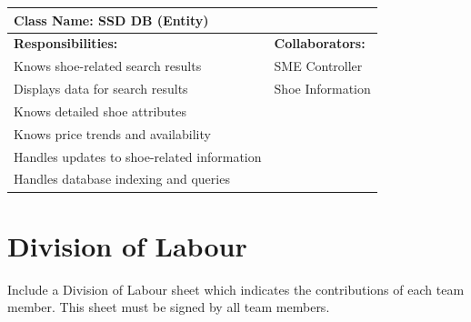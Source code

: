 \documentclass[]{article}
\begin{document}
\begin{table}[H]
    \centering
    \begin{tabular}{|p{}|p{}|}
        \hline
        \multicolumn{2}{|l|}{\textbf{Class Name:} SSD DB (Entity)} \\
        \hline
        \textbf{Responsibilities:} & \textbf{Collaborators:} \\
        \hline
        Knows shoe-related search results & SME Controller \\
        Displays data for search results & Shoe Information \\
        Knows detailed shoe attributes & \\  
        Knows price trends and availability & \\  
        Handles updates to shoe-related information & \\   
        Handles database indexing and queries & \\  
        \hline
    \end{tabular}
    \label{tab:ssd_db}
\end{table}

\appendix
\section{Division of Labour}
\label{sec:division_of_labour}
Include a Division of Labour sheet which indicates the contributions of each team member. This sheet must be signed by all team members.
\end{document}
